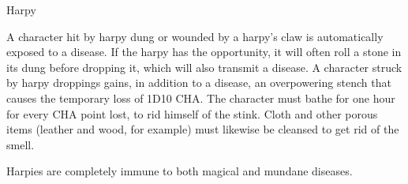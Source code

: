 \begin{monsterbox}{Harpy}
\begin{rpg-monsteraction}
	\end{rpg-monsteraction}
	\begin{rpg-monsteraction}
		A character hit by harpy dung or wounded by a harpy’s claw is automatically exposed to a disease. If the harpy has the opportunity, it will often roll a stone in its dung before dropping it, which will also transmit a disease. A character struck by harpy droppings gains, in addition to a disease, an overpowering stench that causes the temporary loss of 1D10 CHA. The character must bathe for one hour for every CHA point lost, to rid himself of the stink. Cloth and other porous items (leather and wood, for example) must likewise be cleansed to get rid of the smell.
	\end{rpg-monsteraction}
	\begin{rpg-monsteraction}
		Harpies are completely immune to both magical and mundane diseases.
	\end{rpg-monsteraction}

\end{monsterbox}


